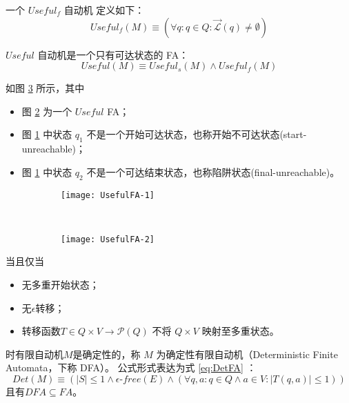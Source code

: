 \begin{definition}
    一个 $Useful_f$ 自动机 定义如下： 
    \[ Useful_f (M) \equiv ( \forall q:q \in Q : \overrightarrow{\mathcal{L}} (q) \not= \emptyset ) \]
\end{definition}

\begin{definition}
    $Useful$ 自动机是一个只有可达状态的 FA：
    \[ Useful (M) \equiv Useful_s (M) \land Useful_f (M) \]
\end{definition}

\begin{example}
    如图 \ref{fig:UsefulFA} 所示，其中
    \begin{itemize}
        \item 图 \ref{fig:UsefulFA-2} 为一个 $Useful$ FA；
        \item 图 \ref{fig:UsefulFA-1} 中状态 $q_1$ 不是一个开始可达状态，也称开始不可达状态(start-unreachable)；
        \item 图 \ref{fig:UsefulFA-1} 中状态 $q_2$ 不是一个可达结束状态，也称陷阱状态(final-unreachable)\cite{book1}。
    \end{itemize}
\end{example}

\begin{figure}[!htbp]
    \centering
    \begin{subfigure}[b]{0.45\textwidth}
        \texttt{[image: UsefulFA-1]}
        \caption{}
        \label{fig:UsefulFA-1}
    \end{subfigure}
    ~
    \begin{subfigure}[b]{0.45\textwidth}
        \texttt{[image: UsefulFA-2]}
        \caption{}
        \label{fig:UsefulFA-2}
    \end{subfigure}
    \caption{}
    \label{fig:UsefulFA}
\end{figure}

\begin{definition}
    当且仅当 
    \begin{itemize}
        \item 无多重开始状态；
        \item 无$\epsilon$转移；
        \item 转移函数$T \in Q \times V \longrightarrow \mathcal{P} (Q) $ 不将 $Q \times V$ 映射至多重状态。
    \end{itemize}
    时有限自动机$M$是确定性的，称 $M$ 为确定性有限自动机（Deterministic Finite Automata，下称 DFA）。
    公式形式表达为式 \ref{eq:DetFA} ：
    \begin{equation}\label{eq:DetFA}
    Det(M) \equiv ( |S| \leq 1 \land \epsilon\mbox{-} free(E) \land ( \forall q,a:q \in Q \land a \in V : |T(q,a)| \leq 1 )) 
    \end{equation}
    且有$ DFA \subseteq FA$。
\end{definition}


